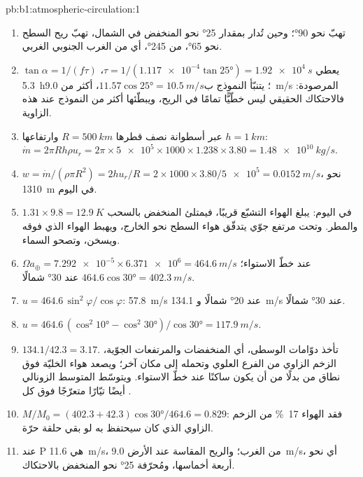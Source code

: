 \begin{solution}{pb:b1:atmospheric-circulation:1}
\begin{enumerate}
  \item تهبّ  نحو  \ang{90}؛ وحين تُدار بمقدار \ang{25} نحو المنخفض في الشمال، تهبّ ريح السطح نحو \ang{65}، من
        \ang{245}، أي من الغرب الجنوبي الغربي.
  \item $\tan\alpha = 1/(f\tau)$ يعطي $\tau = 1/(\num{1.117e-4}\tan\ang{25}) =
        \qty{1.92e4}{s}$، \qty{5.3}{h}؛ يتنبّأ النموذج ب$11.57\cos\ang{25} =
        \qty{10.5}{m/s}$، أكثر من \qty{9.0}{m/s} المرصودة: فالاحتكاك الحقيقي ليس خطّيًّا تمامًا في الريح، ويبطّئها أكثر من النموذج عند هذه الزاوية.
  \item عبر أسطوانة نصف قطرها $R = \qty{500}{km}$ وارتفاعها $h =
        \qty{1}{km}$: $\dot m = 2\pi R h\rho u_r = 2\pi \times \num{5e5} \times 1000
        \times 1.238 \times 3.80 = \qty{1.48e10}{kg/s}$.
  \item $w = \dot m/(\rho\pi R^2) = 2hu_r/R = 2 \times 1000 \times 3.80/\num{5e5} =
        \qty{0.0152}{m/s}$، نحو \qty{1310}{m} في اليوم.
  \item $1.31 \times 9.8 = \qty{12.9}{K}$ في اليوم: يبلغ الهواء التشبّع قريبًا، فيمتلئ المنخفض بالسحب والمطر. وتحت مرتفع جوّي يتدفّق هواء السطح نحو الخارج، ويهبط الهواء الذي فوقه ويسخن، وتصحو السماء.
  \item $\Omega a_\oplus = \num{7.292e-5} \times \num{6.371e6} = \qty{464.6}{m/s}$
        عند خطّ الاستواء؛ $464.6\cos\ang{30} = \qty{402.3}{m/s}$ عند \ang{30} شمالًا.
  \item $u = 464.6\,\sin^2\varphi/\cos\varphi$: \qty{57.8}{m/s} عند \ang{20} شمالًا و
        \qty{134.1}{m/s} عند \ang{30} شمالًا.
  \item $u = 464.6\,(\cos^2\ang{10} - \cos^2\ang{30})/\cos\ang{30} =
        \qty{117.9}{m/s}$.
  \item $134.1/42.3 = 3.17$. تأخذ دوّامات  الوسطى، أي المنخفضات والمرتفعات الجوّية، الزخم الزاوي من الفرع العلوي وتحمله إلى مكان آخر؛ ويصعد هواء الخليّة فوق نطاق من  بدلًا من أن يكون ساكنًا عند خطّ الاستواء. ويتوسّط المتوسط الزونالي أيضًا تيّارًا متعرّجًا فوق كل .
  \item $M/M_0 = (402.3 + 42.3)\cos\ang{30}/464.6 = 0.829$: فقد الهواء
        \qty{17}{\percent} من الزخم الزاوي الذي كان سيحتفظ به لو بقي حلقة حرّة.
  \item {} عند P هي \qty{11.6}{m/s}، من الغرب؛ والريح المقاسة عند الأرض \qty{9.0}{m/s}، أي نحو أربعة أخماسها، ومُحرّفة
        \ang{25} نحو المنخفض بالاحتكاك.
\end{enumerate}
\end{solution}
